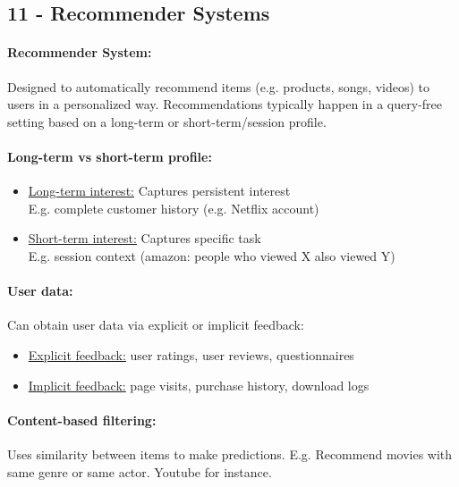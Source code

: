 \documentclass[a4paper,11pt]{article}
\newcommand{\msection}[1]{\section{#1}\vspace{-0.5mm}}
\begin{document}
\begin{multicols}{2}
\msection{11 - Recommender Systems}
\paragraph{Recommender System:} Designed to automatically recommend items (e.g. products, songs, videos) to users in a personalized way. Recommendations typically happen in a query-free setting based on a long-term or short-term/session profile.

\paragraph{Long-term vs short-term profile:} 
\begin{itemize}[leftmargin=0.25cm]
  \item \underline{Long-term interest:} Captures persistent interest\\
        E.g. complete customer history (e.g. Netflix account)
  \item \underline{Short-term interest:} Captures specific task\\
        E.g. session context (amazon: people who viewed X also viewed Y)
\end{itemize}

\paragraph{User data:} Can obtain user data via explicit or implicit feedback:
\begin{itemize}
  \item \underline{Explicit feedback:} user ratings, user reviews, questionnaires
  \item \underline{Implicit feedback:} page visits, purchase history, download logs
\end{itemize}

\paragraph{Content-based filtering:} Uses similarity between items to make predictions. E.g. Recommend movies with same genre or same actor. Youtube for instance.


\end{multicols}
\end{document}
